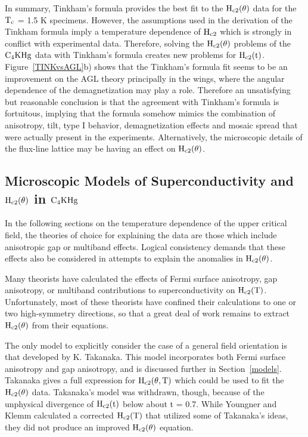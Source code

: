 	In summary,  Tinkham's formula provides  the best  fit to  the $\rm
H_{c2}(\theta)$ data for the  $\rm T_c$ =  1.5  K  specimens.  However, the
assumptions used in the  derivation of  the Tinkham formula\cite{tinkham63}
imply  a  temperature dependence of   $\rm H_{c2}$    which is strongly  in
conflict    with   experimental  data.     Therefore, solving    the   $\rm
H_{c2}(\theta)$ problems of  the $\rm C_4KHg$  data  with Tinkham's formula
creates new problems for  $\rm H_{c2}(t)$.   Figure~\ref{TINKvsAGL}b) shows
that the Tinkham's formula fit seems to be an improvement on the AGL theory
principally   in  the    wings,  where the    angular   dependence  of  the
demagnetization may play a role.  Therefore an unsatisfying  but reasonable
conclusion  is that the  agreement  with  Tinkham's formula is  fortuitous,
implying  that the formula  somehow mimics  the combination of  anisotropy,
tilt, type I behavior, demagnetization effects and  mosaic spread that were
actually    present  in the experiments.    Alternatively,  the microscopic
details of   the  flux-line  lattice  may  be   having an  effect  on  $\rm
H_{c2}(\theta)$.

\subsection{Microscopic Models of Su\-per\-con\-duct\-ivity and $\rm
H_{c2}(\theta)$ in $\rm C_4KHg$}
\label{gaptheta}

	In  the following  sections  on the temperature   dependence of the
upper critical field,  the  theories of choice  for explaining the data are
those  which include   anisotropic  gap or  multiband  effects.     Logical
consistency demands  that these effects also be  considered  in attempts to
explain the anomalies in $\rm H_{c2}(\theta)$.

	Many   theorists  have  calculated  the effects    of Fermi surface
anisotropy, gap anisotropy, or multi\-band con\-tri\-bu\-tions to su\-per\-con\-duct\-ivity
on $\rm  H_{c2}(T)$.\cite{youngner80,butler80,entel76,aljishi88}  Unfortunately,
most of  these theorists  have confined their  calculations  to one  or two
high-symmetry directions, so that a great deal  of  work remains to extract
$\rm H_{c2}(\theta)$ from their equations.

        The only model to explicitly consider the  case of a  general field
orientation is  that developed by  K. Takanaka.\cite{takanaka75} This model
incorporates  both  Fermi surface anisotropy  and  gap  anisotropy,  and is
discussed further   in  Section~\ref{models}.     Takanaka  gives  a   full
expression for $\rm H_{c2}(\theta, T)$ which could be used  to fit the $\rm
H_{c2}(\theta)$ data.  Takanaka's  model  was withdrawn, though, because of
the   unphysical divergence   of   $\rm   H_{c2}(t)$   below  about  t    =
0.7.\cite{ikebe80} While Youngner  and Klemm\cite{youngner80}  calculated a
corrected $\rm H_{c2}(T)$ that utilized some  of Takanaka's ideas, they did
not produce an improved $\rm H_{c2}(\theta)$ equation.

